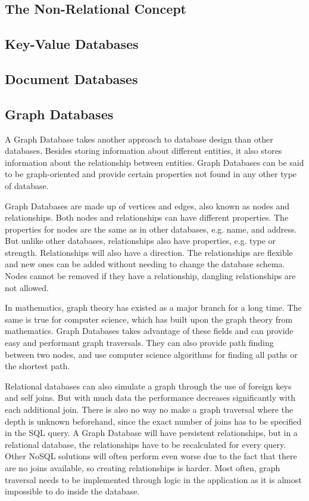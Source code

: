 
\subsection{The Non-Relational Concept}
\label{intro-nosql-concept}

\subsection{Key-Value Databases}
\label{intro-kv-db}

\subsection{Document Databases}
\label{intro-doc-db}

\subsection{Graph Databases}
\label{intro-graph-db}
A Graph Database takes another approach to database design than other databases. Besides storing information about different entities, it also stores information about the relationship between entities. Graph Databases can be said to be graph-oriented and provide certain properties not found in any other type of database.

Graph Databases are made up of vertices and edges, also known as nodes and relationships. Both nodes and relationships can have different properties. The properties for nodes are the same as in other databases, e.g. name, and address. But unlike other databases, relationships also have properties, e.g. type or strength. Relationships will also have a direction. The relationships are flexible and new ones can be added without needing to change the database schema. Nodes cannot be removed if they have a relationship, dangling relationships are not allowed.

In mathematics, graph theory has existed as a major branch for a long time. The same is true for computer science, which has built upon the graph theory from mathematics. Graph Databases takes advantage of these fields and can provide easy and performant graph traversals. They can also provide path finding between two nodes, and use computer science algorithms for finding all paths or the shortest path.

Relational databases can also simulate a graph through the use of foreign keys and self joins. But with much data the performance decreases significantly with each additional join. There is also no way no make a graph traversal where the depth is unknown beforehand, since the exact number of joins has to be specified in the SQL query. A Graph Database will have persistent relationships, but in a relational database, the relationships have to be recalculated for every query. Other NoSQL solutions will often perform even worse due to the fact that there are no joins available, so creating relationships is harder. Most often, graph traversal needs to be implemented through logic in the application as it is almost impossible to do inside the database.

